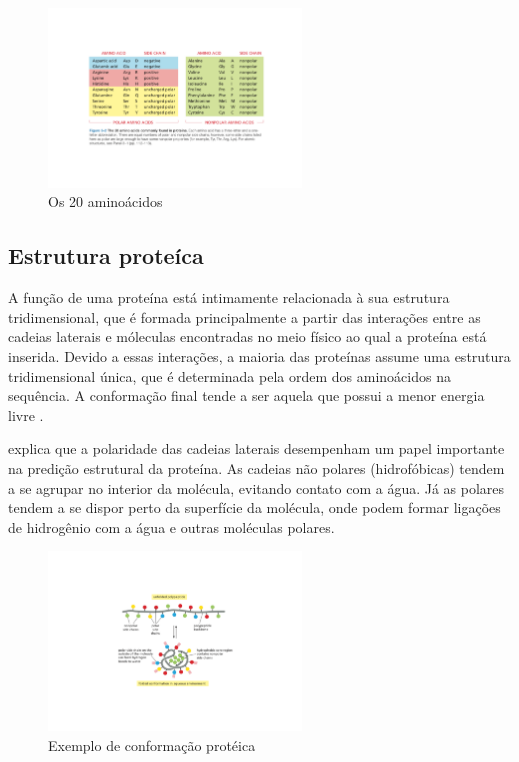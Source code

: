 \begin{figure}[H]
     \centering
     \includegraphics[width=0.6\textwidth]{figuras/20Aminoacidos.pdf}
     \caption{Os 20 aminoácidos \cite{Bio}}
\end{figure}


\subsection{Estrutura proteíca}

A função de uma proteína está intimamente relacionada à sua estrutura tridimensional, que é formada principalmente a partir das interações entre as cadeias laterais e móleculas encontradas no meio físico ao qual a proteína está inserida. Devido a essas interações, a maioria das proteínas assume uma estrutura tridimensional única, que é determinada pela ordem dos aminoácidos na sequência. A conformação final tende a ser aquela que possui a menor energia livre \cite{Bio}.

\cite{Bio} explica que a polaridade das cadeias laterais desempenham um papel importante na predição estrutural da proteína. As cadeias não polares (hidrofóbicas) tendem a se agrupar no interior da molécula, evitando contato com a água. Já as polares tendem a se dispor perto da superfície da molécula, onde podem formar ligações de hidrogênio com a água e outras moléculas polares. 

\begin{figure}[H]
     \centering
     \includegraphics[width=0.6\textwidth]{figuras/ConformacaoProteica.pdf}
     \caption{Exemplo de conformação protéica \cite{Bio}}
\end{figure}

